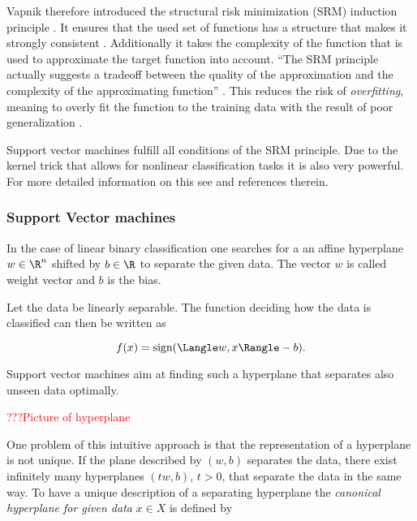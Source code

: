 Vapnik therefore introduced the structural risk minimization (SRM) induction principle . It ensures that the used set of functions has a structure that makes it strongly consistent \cite{Vapnik1999}. Additionally it takes the complexity of the function that is used to approximate the target function into account. ``The SRM principle actually suggests a tradeoff between the quality of the approximation and the complexity of the approximating function'' \cite[p. 994]{Vapnik1999}.
This reduces the risk of \emph{overfitting}, meaning to overly fit the function to the training data with the result of poor generalization \cite[chapter 1.3]{Cristianini2000}.


Support vector machines fulfill all conditions of the SRM principle. Due to the kernel trick that allows for nonlinear classification tasks it is also very powerful. For more detailed information on this see \cite{Kunapuli2008, Vapnik1998} and references therein.

\subsubsection{Support Vector machines}

In the case of linear binary classification one searches for a an affine hyperplane \(w \in \R^n\) shifted by \(b \in \R\) to separate the given data. The vector \(w\) is called weight vector and \(b\) is the bias.

Let the data be linearly separable. The function deciding how the data is classified can then be written as

\[ f(x) = \text{sign}(\Langle w,x\Rangle-b). \]

Support vector machines aim at finding such a hyperplane that separates also unseen data optimally.

\textcolor{red}{???Picture of hyperplane}

One problem of this intuitive approach is that the representation of a hyperplane is not unique. If the plane described by \((w,b)\) separates the data, there exist infinitely many hyperplanes \((tw,b)\), \(t>0\), that separate the data in the same way.
To have a unique description of a separating hyperplane the \emph{canonical hyperplane for given data} \(x \in X\) is defined by 

